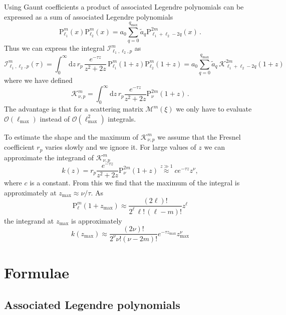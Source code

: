 \documentclass[10pt]{article}
\newcommand{\e}{e}    %
\newcommand{\Plm}[2]{{\text{P}_{#1}^{#2}}}
\newcommand{\lmax}{{\ell_\text{max}}}
\newcommand{\tmax}{{\text{max}}}
\begin{document}
Using Gaunt coefficients a product of associated Legendre polynomials can be expressed as a sum of associated Legendre polynomials
\begin{equation}
\Plm{\ell_1}{m}(x) \Plm{\ell_2}{m}(x) = a_0 \sum_{q=0}^{q_\tmax} \tilde a_q \Plm{\ell_1+\ell_2-2q}{2m}(x) \,.
\end{equation}
Thus we can express the integral $\mathcal{I}_{\ell_1,\ell_2,p}^{m}$ as
\begin{equation}
\mathcal{I}_{\ell_1,\ell_2,p}^{m}(\tau) = \int_0^\infty \mathrm{d}z \, r_p \, \frac{\e^{-\tau z}}{z^2+2z} \, \Plm{\ell_1}{m}(1+z) \Plm{\ell_2}{m}(1+z)
 = a_0 \sum_{q=0}^{q_\tmax} \tilde a_q \, \mathcal{K}_{\ell_1+\ell_2-2q}^{2m}(1+z)
\end{equation}
where we have defined
\begin{equation}
\mathcal{K}_{\nu,p}^m = \int_0^\infty \mathrm{d}z \, r_p \frac{\e^{-\tau z}}{z^2+2z} \Plm{\nu}{2m}(1+z) \,.
\end{equation}
The advantage is that for a scattering matrix $\mathcal{M}^m(\xi)$ we only have
to evaluate $\mathcal{O}(\lmax)$ instead of $\mathcal{O}(\ell_\tmax^2)$
integrals.

To estimate the shape and the maximum of $\mathcal{K}_{\nu,p}^m$ we assume that
the Fresnel coefficient $r_p$ varies slowly and we ignore it. For large values
of $z$ we can approximate the integrand of $\mathcal{K}_{\nu,p}^m$
\begin{equation}
k(z) = r_p \frac{\e^{-\tau z}}{z^2+2z} \Plm{\nu}{2m}(1+z) \overset{z \gg 1}{\approx} c \e^{-\tau z} z^\nu ,
\end{equation}
where $c$ is a constant. From this we find that the maximum of the integral is approximately at $z_\tmax \approx \nu/\tau$.
As
\begin{equation}
\Plm{\ell}{m}(1+z_\tmax) \approx \frac{(2\ell)!}{2^\ell \, \ell! \, (\ell-m)!} z^\ell
\end{equation}
the integrand at $z_\tmax$ is approximately
\begin{equation}
k(z_\tmax) \approx \frac{(2\nu)!}{2^\nu \nu! (\nu-2m)!} \e^{-\tau z_\tmax} z_\tmax^\nu
\end{equation}

\appendix

\section{Formulae}


\subsection{Associated Legendre polynomials}
\end{document}
